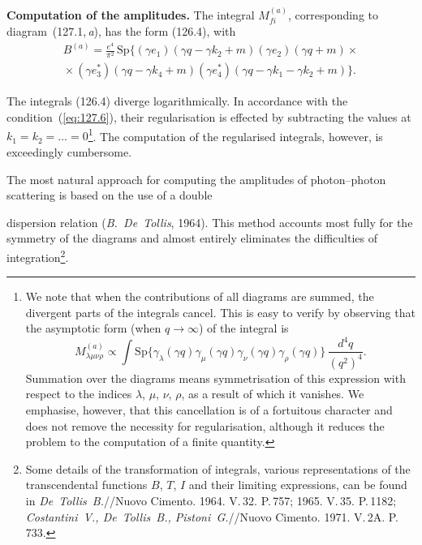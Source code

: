 \textbf{Computation of the amplitudes.} The integral $M_{fi}^{(a)}$, corresponding to diagram~(127.1,\,\textit{a}), has the form (126.4), with
\begin{multline}
B^{(a)} = \frac{e^4}{\pi^2}\,\mathrm{Sp}\{(\gamma e_1)(\gamma q - \gamma k_2 + m)(\gamma e_2)(\gamma q + m) \times {} \\
{}\times (\gamma e_3^*)(\gamma q - \gamma k_4 + m)(\gamma e_4^*)(\gamma q - \gamma k_1 - \gamma k_2 + m)\}.
\label{eq:127.15}
\end{multline}

The integrals (126.4) diverge logarithmically. In accordance with the condition~(\ref{eq:127.6}), their regularisation is effected by subtracting the values at $k_1 = k_2 = \dots = 0$\footnote{We note that when the contributions of all diagrams are summed, the divergent parts of the integrals cancel. This is easy to verify by observing that the asymptotic form (when $q \to \infty$) of the integral is
\[
M_{\lambda\mu\nu\rho}^{(a)} \propto \int \mathrm{Sp}\{\gamma_\lambda(\gamma q)\gamma_\mu(\gamma q)\gamma_\nu(\gamma q)\gamma_\rho(\gamma q)\}\,\frac{d^4q}{(q^2)^4}.
\]
Summation over the diagrams means symmetrisation of this expression with respect to the indices $\lambda$, $\mu$, $\nu$, $\rho$, as a result of which it vanishes. We emphasise, however, that this cancellation is of a fortuitous character and does not remove the necessity for regularisation, although it reduces the problem to the computation of a finite quantity.}. The computation of the regularised integrals, however, is exceedingly cumbersome.

The most natural approach for computing the amplitudes of photon--photon scattering is based on the use of a double


\noindent dispersion relation (\emph{B.~De~Tollis}, 1964). This method accounts most fully for the symmetry of the diagrams and almost entirely eliminates the difficulties of integration\footnote{Some details of the transformation of integrals, various representations of the transcendental functions $B$, $T$, $I$ and their limiting expressions, can be found in \emph{De~Tollis~B.}//Nuovo Cimento. 1964. V.\,32. P.\,757; 1965. V.\,35. P.\,1182; \emph{Costantini~V., De~Tollis~B., Pistoni~G.}//Nuovo Cimento. 1971. V.\,2A. P.\,733.}.


